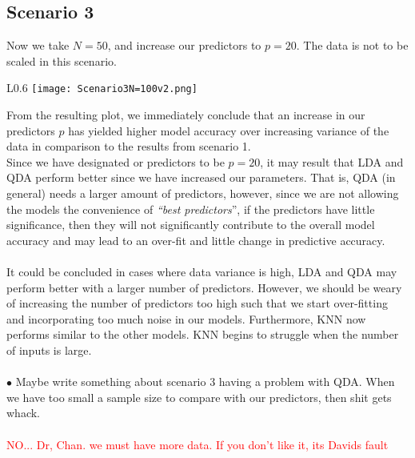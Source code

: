 \documentclass[11pt, oneside]{article}
\begin{document}



\subsection*{Scenario 3}

Now we take $N=50$, and increase our predictors to $p=20$. The data is not to be scaled in this scenario.\\
 
\begin{wrapfigure}[]{L}{0.6\textwidth}
\vspace{-0.55cm}
\texttt{[image: Scenario3N=100v2.png]}
\vspace{-0.5cm}
\end{wrapfigure}

From the resulting plot, we immediately conclude that an increase in our predictors $p$ has yielded higher model accuracy over increasing variance of the data in comparison to the results from scenario 1.\\
Since we have designated or predictors to be $p=20$, it may result that LDA and QDA perform better since we have increased our parameters. 
That is, QDA  (in general) needs a larger amount of predictors, however, since we are not allowing the models the convenience of \emph{``best predictors}'', if the predictors have little significance, then they will not significantly contribute to the overall model accuracy and may lead to an over-fit and little change in predictive accuracy.\\
\\
It could be concluded in cases where data variance is high, LDA and QDA may perform better with a larger number of predictors. However, we should be weary of increasing the number of predictors too high such that we start over-fitting and incorporating too much noise in our models. Furthermore, KNN now performs similar to the other models. KNN begins to struggle when the number of inputs is large.\\
\\
$\bullet$ Maybe write something about scenario 3 having a problem with QDA. When we have too small a sample size to compare with our predictors, then shit gets whack.\\
\\
\textcolor{red}{NO... Dr, Chan. we must have more data. If you don't like it, its Davids fault}\\
\\
 
\end{document}
